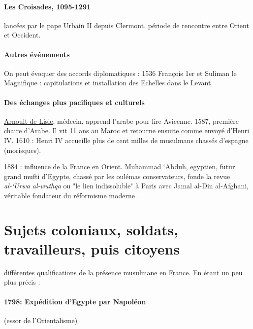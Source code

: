 \paragraph{Les Croisades, 1095-1291}
lancées par le pape Urbain II depuis Clermont.
période de rencontre entre Orient et Occident.

\paragraph{Autres événements}
On peut évoquer des accords diplomatiques : 1536 François 1er et Suliman le Magnifique : capitulations et installation des Echelles dans le Levant.

\paragraph{Des échanges plus pacifiques et culturels} \href{https://fr.wikipedia.org/wiki/Arnoult_de_Lisle}{Arnoult de Lisle}, médecin, apprend l'arabe pour lire Avicenne. 1587, première chaire d'Arabe. Il vit 11 ans au Maroc et retourne ensuite comme envoyé d'Henri IV.
1610 : Henri IV accueille plus de cent milles de musulmans chassés d'espagne (morisques). 

1884 : influence de la France en Orient. Muhammad ‘Abduh, egyptien, futur grand mufti d'Egypte, chassé par les oulémas conservateurs, fonde la revue \emph{al-‘Urwa al-wuthqa} ou "le lien indissoluble" à Paris avec Jamal al-Din al-Afghani, véritable fondateur du réformisme moderne .




\section{Sujets coloniaux, soldats, travailleurs, puis citoyens}

différentes qualifications de la présence musulmane en France.
En étant un peu plus précis : 

\paragraph{1798: Expédition d’Egypte par Napoléon}
(essor de l’Orientalisme)

